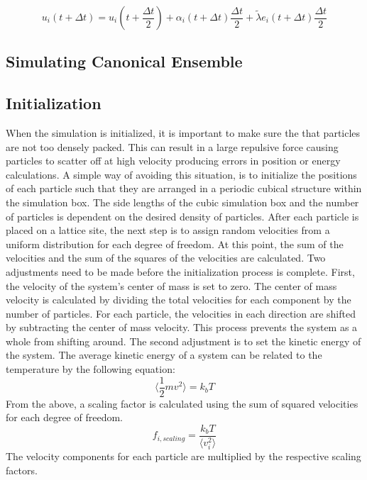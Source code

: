 \documentclass[preprint, aps]{revtex4-1}
\begin{document}
	\begin{equation} \label{vv-u}
		u_i(t+\Delta t) = u_i(t+\frac{\Delta t}{2}) 
		+ \alpha_i(t+\Delta t)\frac{\Delta t}{2} 
		+ \tilde{\lambda} e_i(t+\Delta t)\frac{\Delta t}{2}
	\end{equation}

\subsection*{Simulating Canonical Ensemble}

\subsection*{Initialization}
When the simulation is initialized, it is important to make sure the that 
particles are not too densely packed. This can result in a large repulsive force
causing particles to scatter off at high velocity producing errors in position 
or energy calculations. A simple way of avoiding this situation, is to 
initialize the positions of each particle such that they are arranged in a 
periodic cubical structure within the simulation box. The side lengths of the 
cubic simulation box and the number of particles is dependent on the desired 
density of particles. After each particle is placed on a lattice site, the next 
step is to assign random velocities from a uniform distribution for each degree 
of freedom. At this point, the sum of the velocities and the sum of the squares 
of the velocities are calculated. Two adjustments need to be made before the 
initialization process is complete. First, the velocity of the system's center 
of mass is set to zero. The center of mass velocity is calculated by dividing 
the total velocities for each component by the number of particles. For each 
particle, the velocities in each direction are shifted by subtracting the 
center of mass velocity. This process prevents the system as a whole from 
shifting around. The second adjustment is to set the kinetic energy of the 
system. The average kinetic energy of a system can be related to the temperature 
by the following equation:
	\begin{equation}
		\langle\frac{1}{2}mv^2\rangle=k_bT
	\end{equation}
From the above, a scaling factor is calculated using the sum of squared 
velocities for each degree of freedom.
	\begin{equation}
		f_{i,scaling}=\frac{k_bT}{\langle v_i^2 \rangle}
	\end{equation}
The velocity components for each particle are multiplied by the respective 
scaling factors. 
\end{document}
